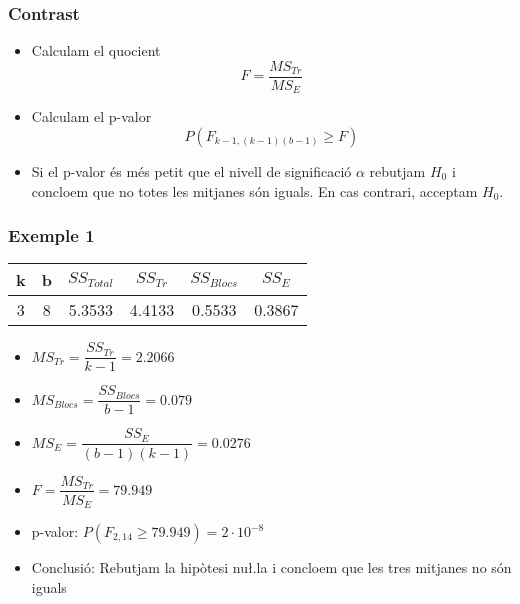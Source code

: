 \documentclass[12pt,t]{beamer}
\renewcommand{\geq}{\geqslant}
\theoremstyle{plain}
\theoremstyle{definition}
\begin{document}
\begin{frame}
\frametitle{Contrast}
\begin{itemize}
\item Calculam  el quocient 
$$
F=\frac{MS_{Tr}}{MS_E}
$$

\item Calculam el p-valor
$$
P(F_{k-1,(k-1)(b-1)}\geq F)
$$

\item Si el p-valor és més petit que el nivell de significació $\alpha$  rebutjam $H_0$ i concloem que no totes les mitjanes són iguals. En cas contrari, acceptam $H_0$.
\end{itemize}
\end{frame}





\begin{frame}
\frametitle{Exemple 1}
\vspace*{-3ex}

\begin{center}
\begin{tabular}{cccccc}
k & b & $SS_{Total}$ & $SS_{Tr}$ & $SS_{Blocs}$ & $SS_E$\\ \hline
3 & 8 & 5.3533  & 4.4133 & 0.5533  & 0.3867
\end{tabular}
\end{center}

\begin{itemize}
\item $MS_{Tr}=\dfrac{SS_{Tr}}{k-1}=2.2066$
\medskip

\item $MS_{Blocs}=\dfrac{SS_{Blocs}}{b-1}=0.079$
\medskip

\item $MS_E = \dfrac{SS_E}{(b-1) (k-1)}=0.0276$
\medskip

\item $F=\dfrac{MS_{Tr}}{MS_E}=79.949$
\medskip

\item p-valor: $P(F_{2,14}\geq 79.949)=2\cdot 10^{-8}$
\medskip

\item Conclusió: Rebutjam la hipòtesi nu\l.la i concloem que les tres mitjanes no són iguals

\end{itemize}
\end{frame}
\end{document}
